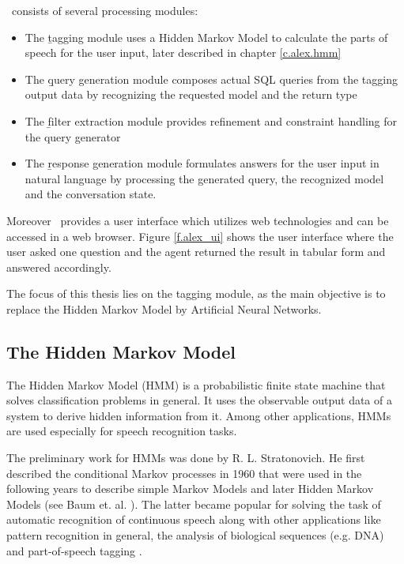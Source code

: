 \Alex\ consists of several processing modules:

\begin{itemize}
	\item The \b{tagging module} uses a Hidden Markov Model to calculate the parts of speech for the user input, later described in chapter \ref{c.alex.hmm}
	\item The \b{query generation module} composes actual SQL queries from the tagging output data by recognizing the requested model and the return type
	\item The \b{filter extraction module} provides refinement and constraint handling for the query generator
	\item The \b{response generation module} formulates answers for the user input in natural language by processing the generated query, the recognized model and the conversation state.
\end{itemize}

Moreover \Alex\ provides a user interface which utilizes web technologies and can be accessed in a web browser. Figure \ref{f.alex_ui} shows the user interface where the user asked one question and the agent returned the result in tabular form and answered accordingly.

The focus of this thesis lies on the tagging module, as the main objective is to replace the Hidden Markov Model by Artificial Neural Networks.

\subsection{The Hidden Markov Model}\label{c.introduction.related.hmm}
The Hidden Markov Model (HMM) is a probabilistic finite state machine that solves classification problems in general. It uses the observable output data of a system to derive hidden information from it. Among other applications, HMMs are used especially for speech recognition tasks.

The preliminary work for HMMs was done by R. L. Stratonovich. He first described the conditional Markov processes in 1960 \cite{stratonovich1960} that were used in the following years to describe simple Markov Models and later Hidden Markov Models (see Baum et. al. \cite{baum1966}\cite{baum1967}). The latter became popular for solving the task of automatic recognition of continuous speech \cite{baker1975} along with other applications like pattern recognition in general, the analysis of biological sequences (e.g. DNA) \cite{bishop1986} and part-of-speech tagging \cite{kupiec1992}.

